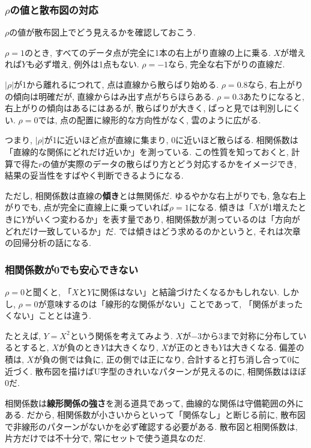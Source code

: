 \subsubsection*{$\rho$の値と散布図の対応}

$\rho$の値が散布図上でどう見えるかを確認しておこう.

$\rho = 1$のとき, すべてのデータ点が完全に1本の右上がり直線の上に乗る.
$X$が増えれば$Y$も必ず増え, 例外は1点もない.
$\rho = -1$なら, 完全な右下がりの直線だ.

$|\rho|$が1から離れるにつれて, 点は直線から散らばり始める.
$\rho = 0.8$なら, 右上がりの傾向は明確だが, 直線からはみ出す点がちらほらある.
$\rho = 0.3$あたりになると, 右上がりの傾向はあるにはあるが, 散らばりが大きく, ぱっと見では判別しにくい.
$\rho = 0$では, 点の配置に線形的な方向性がなく, 雲のように広がる.


つまり, $|\rho|$が1に近いほど点が直線に集まり, 0に近いほど散らばる.
相関係数は「直線的な関係にどれだけ近いか」を測っている.
この性質を知っておくと, 計算で得た$r$の値が実際のデータの散らばり方とどう対応するかをイメージでき, 結果の妥当性をすばやく判断できるようになる.

ただし, 相関係数は直線の\textbf{傾き}とは無関係だ.
ゆるやかな右上がりでも, 急な右上がりでも, 点が完全に直線上に乗っていれば$\rho = 1$になる.
傾きは「$X$が1増えたときに$Y$がいくつ変わるか」を表す量であり, 相関係数が測っているのは「方向がどれだけ一致しているか」だ.
では傾きはどう求めるのかというと, それは次章の回帰分析の話になる.

\subsubsection*{相関係数が0でも安心できない}

$\rho = 0$と聞くと, 「$X$と$Y$に関係はない」と結論づけたくなるかもしれない.
しかし, $\rho = 0$が意味するのは「線形的な関係がない」ことであって, 「関係がまったくない」こととは違う.

たとえば, $Y = X^2$という関係を考えてみよう.
$X$が$-3$から$3$まで対称に分布しているとすると, $X$が負のとき$Y$は大きくなり, $X$が正のときも$Y$は大きくなる.
偏差の積は, $X$が負の側では負に, 正の側では正になり, 合計すると打ち消し合って0に近づく.
散布図を描けばU字型のきれいなパターンが見えるのに, 相関係数はほぼ0だ.

相関係数は\textbf{線形関係の強さ}を測る道具であって, 曲線的な関係は守備範囲の外にある.
だから, 相関係数が小さいからといって「関係なし」と断じる前に, 散布図で非線形のパターンがないかを必ず確認する必要がある.
散布図と相関係数は, 片方だけでは不十分で, 常にセットで使う道具なのだ.


